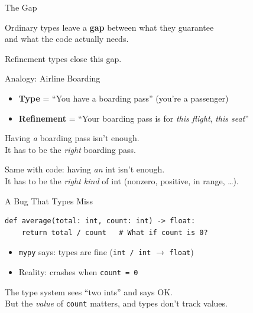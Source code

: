 \documentclass[aspectratio=169,10pt]{beamer}
\newcommand{\hint}[1]{\begin{center}
  \colorbox{hintbg}{\parbox{0.88\textwidth}{\centering\small #1}}\end{center}}
\begin{document}
\begin{frame}{The Gap}
\begin{center}
\end{center}
\vspace{0.5em}
Ordinary types leave a \textbf{gap} between what they guarantee\\
and what the code actually needs.
\hint{Refinement types close this gap.}
\end{frame}

\begin{frame}{Analogy: Airline Boarding}
\begin{itemize}
  \item \textbf{Type} = ``You have a boarding pass'' (you're a passenger)
  \item \textbf{Refinement} = ``Your boarding pass is for \emph{this flight}, \emph{this seat}''
\end{itemize}
\vspace{0.5em}
Having \emph{a} boarding pass isn't enough.\\
It has to be the \emph{right} boarding pass.
\vspace{0.5em}

Same with code: having \emph{an} int isn't enough.\\
It has to be the \emph{right kind} of int (nonzero, positive, in range, \ldots).
\end{frame}

\begin{frame}[fragile]{A Bug That Types Miss}
\begin{lstlisting}
def average(total: int, count: int) -> float:
    return total / count   # What if count is 0?
\end{lstlisting}
\vspace{0.3em}
\begin{itemize}
  \item \texttt{mypy} says: \textcolor{safe}{\checkmark} types are fine (\texttt{int / int} $\to$ \texttt{float})
  \item Reality: \textcolor{danger}{\texttimes} crashes when \texttt{count = 0}
\end{itemize}
\vspace{0.3em}
The type system sees ``two ints'' and says OK.\\
But the \emph{value} of \texttt{count} matters, and types don't track values.
\end{frame}
\end{document}
